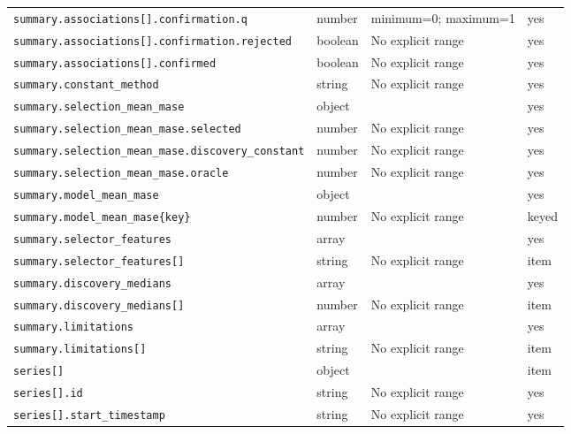 \begin{longtable}{@{}p{}p{}p{}p{}@{}}
\texttt{summary.\allowbreak{}associations[].\allowbreak{}confirmation.\allowbreak{}q} & number & minimum=0; maximum=1 & yes\\
\texttt{summary.\allowbreak{}associations[].\allowbreak{}confirmation.\allowbreak{}rejected} & boolean & No explicit range & yes\\
\texttt{summary.\allowbreak{}associations[].\allowbreak{}confirmed} & boolean & No explicit range & yes\\
\texttt{summary.\allowbreak{}constant\_\allowbreak{}method} & string & No explicit range & yes\\
\texttt{summary.\allowbreak{}selection\_\allowbreak{}mean\_\allowbreak{}mase} & object &  & yes\\
\texttt{summary.\allowbreak{}selection\_\allowbreak{}mean\_\allowbreak{}mase.\allowbreak{}selected} & number & No explicit range & yes\\
\texttt{summary.\allowbreak{}selection\_\allowbreak{}mean\_\allowbreak{}mase.\allowbreak{}discovery\_\allowbreak{}constant} & number & No explicit range & yes\\
\texttt{summary.\allowbreak{}selection\_\allowbreak{}mean\_\allowbreak{}mase.\allowbreak{}oracle} & number & No explicit range & yes\\
\texttt{summary.\allowbreak{}model\_\allowbreak{}mean\_\allowbreak{}mase} & object &  & yes\\
\texttt{summary.\allowbreak{}model\_\allowbreak{}mean\_\allowbreak{}mase\{key\}} & number & No explicit range & keyed\\
\texttt{summary.\allowbreak{}selector\_\allowbreak{}features} & array &  & yes\\
\texttt{summary.\allowbreak{}selector\_\allowbreak{}features[]} & string & No explicit range & item\\
\texttt{summary.\allowbreak{}discovery\_\allowbreak{}medians} & array &  & yes\\
\texttt{summary.\allowbreak{}discovery\_\allowbreak{}medians[]} & number & No explicit range & item\\
\texttt{summary.\allowbreak{}limitations} & array &  & yes\\
\texttt{summary.\allowbreak{}limitations[]} & string & No explicit range & item\\
\texttt{series[]} & object &  & item\\
\texttt{series[].\allowbreak{}id} & string & No explicit range & yes\\
\texttt{series[].\allowbreak{}start\_\allowbreak{}timestamp} & string & No explicit range & yes\\

\end{longtable}
